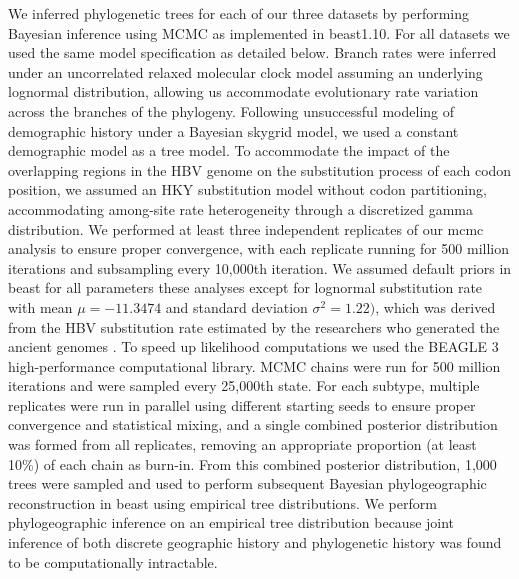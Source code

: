 We inferred phylogenetic trees for each of our three datasets by performing Bayesian inference using MCMC as implemented in \gls{beast}1.10\cite{suchard2018bayesian}.
For all datasets we used the same model specification as detailed below.
Branch rates were inferred under an uncorrelated relaxed molecular clock model assuming an underlying lognormal distribution, allowing us accommodate evolutionary rate variation across the branches of the phylogeny.
Following unsuccessful modeling of demographic history under a Bayesian skygrid model, we used a constant demographic model as a tree model. %
To accommodate the impact of the overlapping regions in the HBV genome on the substitution process of each codon position, we assumed an HKY substitution model\cite{hasegawa1985dating} without codon partitioning, accommodating among-site rate heterogeneity through a discretized gamma distribution\cite{yang1993maximum}.
We performed at least three independent replicates of our \gls{mcmc} analysis to ensure proper convergence, with each replicate running for 500 million iterations and subsampling every 10,000th iteration. %
We assumed default priors in \gls{beast} for all parameters these analyses except for lognormal substitution rate with mean $\mu=-11.3474$ and standard deviation $\sigma^{2}=1.22)$, %
which was derived from the HBV substitution rate estimated by the researchers who generated the ancient genomes \cite{muhlemann2018ancient}.
To speed up likelihood computations we used the BEAGLE 3 high-performance computational library.
MCMC chains were run for 500 million iterations and were sampled every 25,000th state.
For each subtype, multiple replicates were run in parallel using different starting seeds to ensure proper convergence and statistical mixing, and a single combined posterior distribution was formed from all replicates, removing an appropriate proportion (at least 10\%) of each chain as burn-in.
From this combined posterior distribution, 1,000 trees were sampled and used to perform subsequent Bayesian phylogeographic reconstruction in \gls{beast} using empirical tree distributions.
We perform phylogeographic inference on an empirical tree distribution because joint inference of both discrete geographic history and phylogenetic history was found to be computationally intractable.

